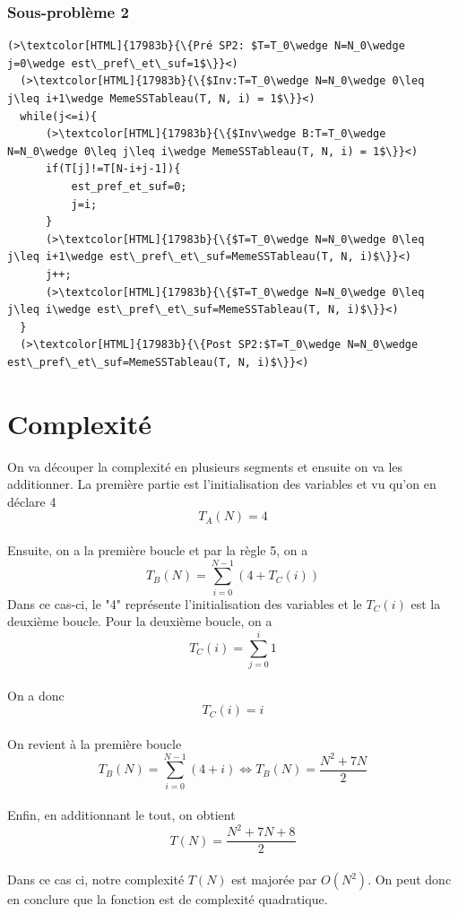 \documentclass[a4paper, 11pt, oneside]{article}
\begin{document}
\newpage

\subsubsection{Sous-problème 2}
\begin{lstlisting}[caption={Sous-problème 2}]
  (>\textcolor[HTML]{17983b}{\{Pré SP2: $T=T_0\wedge N=N_0\wedge j=0\wedge est\_pref\_et\_suf=1$\}}<)
  (>\textcolor[HTML]{17983b}{\{$Inv:T=T_0\wedge N=N_0\wedge 0\leq j\leq i+1\wedge MemeSSTableau(T, N, i) = 1$\}}<)
  while(j<=i){
      (>\textcolor[HTML]{17983b}{\{$Inv\wedge B:T=T_0\wedge N=N_0\wedge 0\leq j\leq i\wedge MemeSSTableau(T, N, i) = 1$\}}<)
      if(T[j]!=T[N-i+j-1]){
          est_pref_et_suf=0;
          j=i;
      }
      (>\textcolor[HTML]{17983b}{\{$T=T_0\wedge N=N_0\wedge 0\leq j\leq i+1\wedge est\_pref\_et\_suf=MemeSSTableau(T, N, i)$\}}<)
      j++;
      (>\textcolor[HTML]{17983b}{\{$T=T_0\wedge N=N_0\wedge 0\leq j\leq i\wedge est\_pref\_et\_suf=MemeSSTableau(T, N, i)$\}}<)
  }
  (>\textcolor[HTML]{17983b}{\{Post SP2:$T=T_0\wedge N=N_0\wedge est\_pref\_et\_suf=MemeSSTableau(T, N, i)$\}}<)
\end{lstlisting}


\section{Complexité}
On va découper la complexité en plusieurs segments et ensuite on va les additionner.
La première partie est l'initialisation des variables et vu qu'on en déclare 4 $$T_A(N)=4$$\\
Ensuite, on a la première boucle et par la règle 5, on a $$T_B(N)=\sum_{i=0}^{N-1}(4+T_C(i))$$ Dans ce cas-ci, le "4" représente l'initialisation des variables et le $T_C(i)$ est la deuxième boucle.
Pour la deuxième boucle, on a $$T_C(i)=\sum_{j=0}^i1$$\\
On a donc $$T_C(i)=i$$\\
On revient à la première boucle $$T_B(N)=\sum_{i=0}^{N-1}(4+i)\Leftrightarrow T_B(N)=\frac{N^2+7N}{2}$$\\
Enfin, en additionnant le tout, on obtient $$T(N)=\frac{N^2+7N+8}{2}$$\\
Dans ce cas ci, notre complexité $T(N)$ est majorée par $O(N^2)$. On peut donc en conclure que la fonction est de complexité quadratique.
\end{document}
